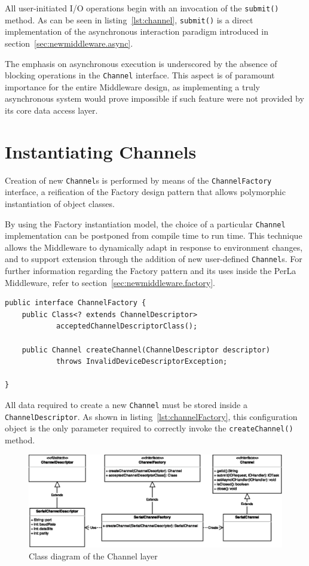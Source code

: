 All user-initiated I/O operations begin with an invocation of the \texttt{submit()} method. As can be seen in listing~\ref{lst:channel}, \texttt{submit()} is a direct implementation of the asynchronous interaction paradigm introduced in section~\ref{sec:newmiddleware.async}.

The emphasis on asynchronous execution is underscored by the absence of blocking operations in the \texttt{Channel} interface. This aspect is of paramount importance for the entire Middleware design, as implementing a truly asynchronous system would prove impossible if such feature were not provided by its core data access layer.


\section{Instantiating Channels}

Creation of new \texttt{Channel}s is performed by means of the  \texttt{ChannelFactory} interface, a reification of the Factory design pattern that allows polymorphic instantiation of object classes.

By using the Factory instantiation model, the choice of a particular \texttt{Channel} implementation can be postponed from compile time to run time. This technique allows the Middleware to dynamically adapt in response to environment changes, and to support extension through the addition of new user-defined \texttt{Channel}s. For further information regarding the Factory pattern and its uses inside the PerLa Middleware, refer to section~\ref{sec:newmiddleware.factory}.

\lstset{language=Java}
\begin{lstlisting}[float,floatplacement=H,caption=The ChannelFactory interface,label={lst:channelFactory}]
public interface ChannelFactory {
	public Class<? extends ChannelDescriptor>
			acceptedChannelDescriptorClass();

	public Channel createChannel(ChannelDescriptor descriptor)
			throws InvalidDeviceDescriptorException;

}
\end{lstlisting}

All data required to create a new \texttt{Channel} must be stored inside a \texttt{ChannelDescriptor}. As shown in listing~\ref{lst:channelFactory}, this configuration object is the only parameter required to correctly invoke the \texttt{createChannel()} method.

\begin{figure}[h!]
\includegraphics[width=\textwidth]{imgs/channel_factory.eps}
\caption{Class diagram of the Channel layer}
\end{figure}

